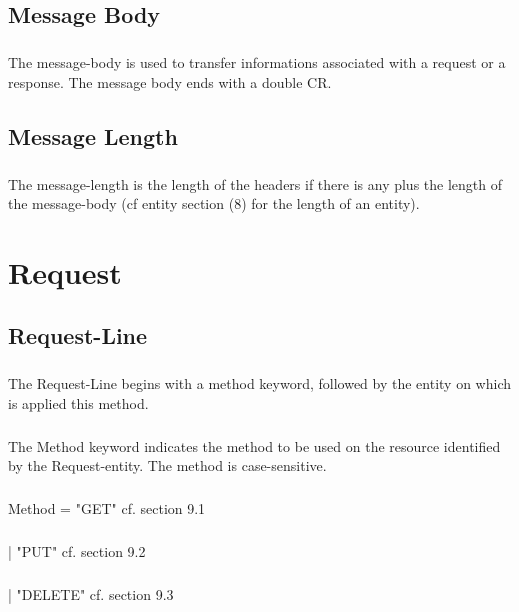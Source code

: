     \section{Message Body}
        \paragraph{}
The message-body is used to transfer informations associated with a
request or a response. The message body ends with a double CR.

    \section{Message Length}
        \paragraph{}
The message-length is the length of the headers if there is any plus
the length of the message-body (cf entity section (8) for the length
of an entity).


    \clearpage
\chapter{Request}
    \section{Request-Line}
        \paragraph{}
The Request-Line begins with a method keyword, followed by the entity
on which is applied this method.
        \paragraph{}
The Method keyword indicates the method to be used on the resource
identified by the Request-entity. The method is case-sensitive.
        \paragraph{}
Method         = "GET"                    cf. section 9.1
        \paragraph{}
                | "PUT"                    cf. section 9.2
        \paragraph{}
                | "DELETE"                 cf. section 9.3
